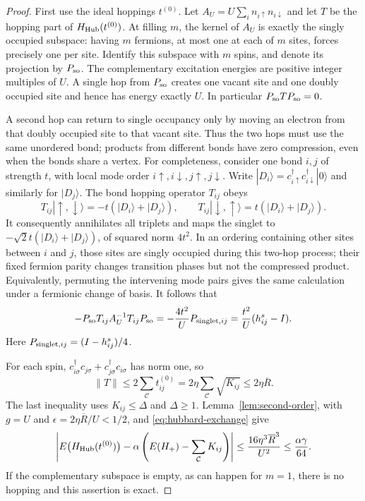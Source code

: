 \begin{proof}
First use the ideal hoppings $t^{(0)}$.  Let
$A_U=U\sum_i n_{i\uparrow}n_{i\downarrow}$ and let $T$ be the hopping
part of $H_{\rm Hub}(t^{(0)})$.  At filling $m$, the kernel of $A_U$
is exactly the singly occupied subspace: having $m$ fermions, at most
one at each of $m$ sites, forces precisely one per site.  Identify this
subspace with $m$ spins, and denote its projection by $P_{\rm so}$.
The complementary excitation energies are positive integer multiples
of $U$.  A single hop from $P_{\rm so}$ creates one vacant site
and one doubly occupied site and hence has energy exactly $U$.
In particular $P_{\rm so}TP_{\rm so}=0$.

A second hop can return to single occupancy only by moving an electron
from that doubly occupied site to that vacant site.  Thus the two hops
must use the same unordered bond; products from different bonds have
zero compression, even when the bonds share a vertex.
For completeness, consider one bond $i,j$ of strength $t$, with local
mode order $i\uparrow,i\downarrow,j\uparrow,j\downarrow$.
Write $|D_i\rangle=c_{i\uparrow}^\dagger
c_{i\downarrow}^\dagger|0\rangle$ and similarly for $|D_j\rangle$.
The bond hopping operator $T_{ij}$ obeys
\[
 T_{ij}|\uparrow,\downarrow\rangle
      =-t(|D_i\rangle+|D_j\rangle),\qquad
 T_{ij}|\downarrow,\uparrow\rangle
      = t(|D_i\rangle+|D_j\rangle).
\]
It consequently annihilates all triplets and maps the singlet to
$-\sqrt2t(|D_i\rangle+|D_j\rangle)$, of squared norm $4t^2$.
In an ordering containing other sites between $i$ and $j$, those sites
are singly occupied during this two-hop process; their fixed fermion
parity changes transition phases but not the compressed product.
Equivalently, permuting the intervening mode pairs gives the same
calculation under a fermionic change of basis.  It follows that
\begin{equation}\label{eq:hubbard-exchange}
 -P_{\rm so}T_{ij}A_U^{-1}T_{ij}P_{\rm so}
       =-\frac{4t^2}{U}P_{{\rm singlet},ij}
       =\frac{t^2}{U}(h^s_{ij}-I).
\end{equation}
Here $P_{{\rm singlet},ij}=(I-h^s_{ij})/4$.

For each spin, $c_{i\sigma}^\dagger c_{j\sigma}
+c_{j\sigma}^\dagger c_{i\sigma}$ has norm one, so
\[
 \lVert T\rVert\leq2\sum_{\mathcal C}t^{(0)}_{ij}
       =2\eta\sum_{\mathcal C}\sqrt{K_{ij}}
       \leq2\eta\overline R.
\]
The last inequality uses $K_{ij}\leq\Delta$ and $\Delta\geq1$.
Lemma~\ref{lem:second-order}, with $g=U$ and
$\epsilon=2\eta\overline R/U<1/2$, and
\eqref{eq:hubbard-exchange} give
\begin{equation}\label{eq:ideal-hubbard-error}
 \left|E\bigl(H_{\rm Hub}(t^{(0)})\bigr)
       -\alpha\left(E(H_+)-\sum_{\mathcal C}K_{ij}\right)\right|
 \leq\frac{16\eta^3\overline R^3}{U^2}
 \leq\frac{\alpha\gamma}{64}.
\end{equation}
If the complementary subspace is empty, as can happen for $m=1$,
there is no hopping and this assertion is exact.


\end{proof}
